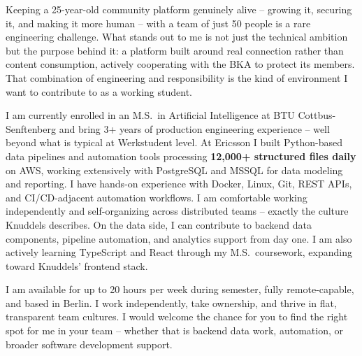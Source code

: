 \documentclass[11pt, a4paper]{awesome-cv}
\begin{document}
\makecvheader[R]
\makelettertitle

\begin{cvletter}

Keeping a 25-year-old community platform genuinely alive -- growing it, securing it, and making it more human -- with a team of just 50 people is a rare engineering challenge. What stands out to me is not just the technical ambition but the purpose behind it: a platform built around real connection rather than content consumption, actively cooperating with the BKA to protect its members. That combination of engineering and responsibility is the kind of environment I want to contribute to as a working student.

I am currently enrolled in an M.S.\ in Artificial Intelligence at BTU Cottbus-Senftenberg and bring 3+ years of production engineering experience -- well beyond what is typical at Werkstudent level. At Ericsson I built Python-based data pipelines and automation tools processing \textbf{12,000+ structured files daily} on AWS, working extensively with PostgreSQL and MSSQL for data modeling and reporting. I have hands-on experience with Docker, Linux, Git, REST APIs, and CI/CD-adjacent automation workflows. I am comfortable working independently and self-organizing across distributed teams -- exactly the culture Knuddels describes. On the data side, I can contribute to backend data components, pipeline automation, and analytics support from day one. I am also actively learning TypeScript and React through my M.S.\ coursework, expanding toward Knuddels' frontend stack.

I am available for up to 20 hours per week during semester, fully remote-capable, and based in Berlin. I work independently, take ownership, and thrive in flat, transparent team cultures. I would welcome the chance for you to find the right spot for me in your team -- whether that is backend data work, automation, or broader software development support.

\end{cvletter}

\makeletterclosing
\end{document}
